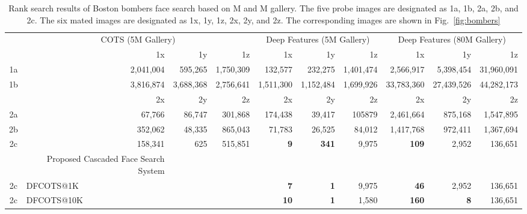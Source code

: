 \documentclass[10pt,journal,compsoc]{IEEEtran}
\begin{document}
\begin{table*}[htbp]
\scriptsize
\centering
\caption{Rank search results of Boston bombers face search based on M and M gallery. The five probe images are designated as 1a, 1b, 2a, 2b, and 2c. The six mated images are designated as 1x, 1y, 1z, 2x, 2y, and 2z. The corresponding images are shown in Fig.~\ref{fig:bombers}}\label{tab:bomber}
\begin{tabular}{crrr|rrr|rrr}
\toprule
\multicolumn{1}{c|}{} & \multicolumn{3}{c|}{COTS (5M Gallery)} & \multicolumn{3}{c|}{Deep Features (5M Gallery)} & \multicolumn{3}{c}{Deep Features (80M Gallery)}\\
\cmidrule{2-10}
\multicolumn{1}{c|}{} & 1x & 1y & 1z & 1x & 1y & 1z & 1x & 1y & 1z \\
\cmidrule{1-10}
\multicolumn{1}{c|}{1a}  & 2,041,004     & 595,265       & 1,750,309     & 132,577       & 232,275       & 1,401,474                & 2,566,917  & 5,398,454     & 31,960,091    \\
\multicolumn{1}{c|}{1b}  & 3,816,874     & 3,688,368     & 2,756,641     & 1,511,300     & 1,152,484     & 1,699,926                & 33,783,360 & 27,439,526    & 44,282,173    \\
\cmidrule{1-10}
\multicolumn{1}{c|}{} & 2x & 2y & 2z & 2x & 2y & 2z & 2x & 2y & 2z \\
\cmidrule{1-10}
\multicolumn{1}{c|}{2a}& 67,766        & 86,747        & 301,868       & 174,438       & 39,417        & 105879                 & 2,461,664  & 875,168       & 1,547,895     \\
\multicolumn{1}{c|}{2b} & 352,062       & 48,335        & 865,043       & 71,783        & 26,525        & 84,012                  & 1,417,768  & 972,411       & 1,367,694     \\
\multicolumn{1}{c|}{2c} & 158,341       & 625           & 515,851       & {\bf 9}       & {\bf 341}     & 9,975                   & {\bf 109}  & 2,952         & 136,651       \\
\cmidrule{1-10}
& Proposed Cascaded Face Search System\\
\cmidrule{1-10}
\multicolumn{1}{c|}{2c} & \multicolumn{3}{l|}{DFCOTS@1K}   & {\bf  7}      & {\bf 1}       & 9,975 & {\bf 46}   & 2,952         & 136,651 \\
\multicolumn{1}{c|}{2c} & \multicolumn{3}{l|}{DFCOTS@10K}  & {\bf 10}      & {\bf 1}       & 1,580 & {\bf 160}  & {\bf 8}       & 136,651 \\
\bottomrule
\end{tabular}
\end{table*}
\end{document}
